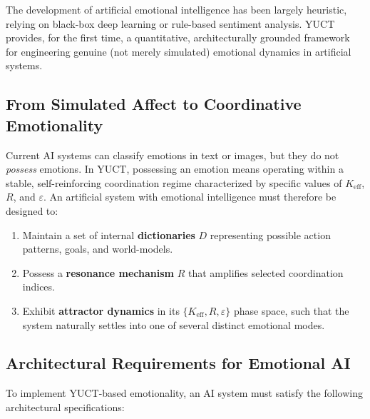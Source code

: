 \documentclass[12pt,a4paper]{article}
\begin{document}
	The development of artificial emotional intelligence has been largely heuristic, relying on black-box deep learning or rule-based sentiment analysis. YUCT provides, for the first time, a quantitative, architecturally grounded framework for engineering genuine (not merely simulated) emotional dynamics in artificial systems.
	
	\subsection{From Simulated Affect to Coordinative Emotionality}
	
	Current AI systems can classify emotions in text or images, but they do not \textit{possess} emotions. In YUCT, possessing an emotion means operating within a stable, self-reinforcing coordination regime characterized by specific values of \(K_{\mathrm{eff}}\), \(R\), and \(\varepsilon\). An artificial system with emotional intelligence must therefore be designed to:
	
	\begin{enumerate}
		\item Maintain a set of internal \textbf{dictionaries} \(D\) representing possible action patterns, goals, and world-models.
		\item Possess a \textbf{resonance mechanism} \(R\) that amplifies selected coordination indices.
		\item Exhibit \textbf{attractor dynamics} in its \(\{K_{\mathrm{eff}}, R, \varepsilon\}\) phase space, such that the system naturally settles into one of several distinct emotional modes.
	\end{enumerate}
	
	\subsection{Architectural Requirements for Emotional AI}
	
	To implement YUCT-based emotionality, an AI system must satisfy the following architectural specifications:
	
\end{document}
